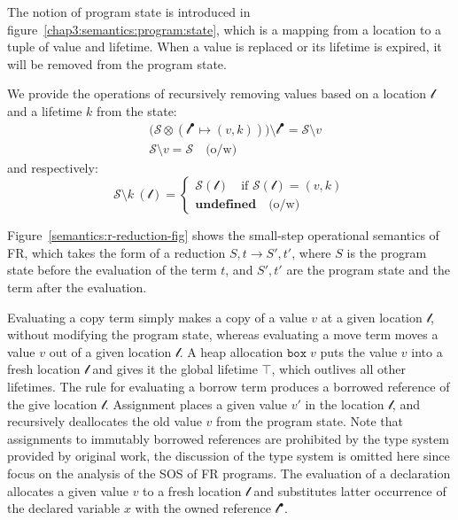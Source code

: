 The notion of program state is introduced in figure~\ref{chap3:semantics:program:state}, which is a mapping from a location to a tuple of value and lifetime. When a value is replaced or its lifetime is expired, it will be removed from the program state.

We provide the operations of recursively removing values based on a location $\mathscr{l}$ and a lifetime $k$ from the state: 
\begin{align*}
      &\bigl(\mathcal{S}\otimes(\mathscr{l}^\bullet \mapsto (v, k))\bigr)\setminus {\mathscr{l}^\bullet} = \mathcal{S}\setminus v \\
      &\mathcal{S}\setminus v = \mathcal{S} \quad\text{(o/w)}
\end{align*}
and respectively:
\[
   \mathcal{S}\setminus k \ (\mathscr{l}) =
    \begin{cases}
      \mathcal{S}(\mathscr{l}) \quad\text{if $\mathcal{S}(\mathscr{l})=(v,k)$} \\
      \textbf{undefined}\quad\text{(o/w)}
    \end{cases}
\] %

Figure~\ref{semantics:r-reduction-fig} shows the small-step operational semantics of FR, which takes the form of a reduction $S, t \longrightarrow S', t'$, where $S$ is the program state before the evaluation of the term $t$, and $S', t'$ are the program state and the term after the evaluation.

Evaluating a copy term simply makes a copy of a value $v$ at a given location $\mathscr{l}$, without modifying the program state, whereas evaluating a move term moves a value $v$ out of a given location $\mathscr{l}$.
A heap allocation $\texttt{box}\;v$ puts the value $v$ into a fresh location $\mathscr{l}$ and gives it the global lifetime $\top$, which outlives all other lifetimes. The rule for evaluating a borrow term produces a borrowed reference of the give location $\mathscr{l}$.
Assignment places a given value $v'$ in the location $\mathscr{l}$, and recursively deallocates the old value $v$ from the program state. Note that assignments to immutably borrowed references are prohibited by the type system provided by  original work, the discussion of the type system is omitted here since focus on the analysis of the SOS of FR programs.
The evaluation of a declaration allocates a given value $v$ to a fresh location $\mathscr{l}$ and substitutes latter occurrence of the declared variable $x$ with the owned reference $\mathscr{l}^\bullet$.

